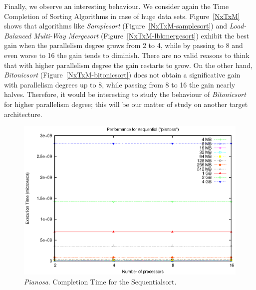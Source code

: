 Finally, we observe an interesting behaviour. We consider again the Time Completion of Sorting Algorithms in case of huge data sets. Figure~\ref{NxTxM} shows that algorithms like \textit{Samplesort} (Figure~\ref{NxTxM-samplesort}) and \textit{Load-Balanced Multi-Way Mergesort} (Figure~\ref{NxTxM-lbkmergesort}) exhibit the best gain when the parallelism degree grows from 2 to 4, while by passing to 8 and even worse to 16 the gain tends to diminish. There are no valid reasons to think that with higher parallelism degree the gain restarts to grow. On the other hand, \textit{Bitonicsort} (Figure~\ref{NxTxM-bitonicsort}) does not obtain a significative gain with parallelism degrees up to 8, while passing from 8 to 16 the gain nearly halves. Therefore, it would be interesting to study the behaviour of \textit{Bitonicsort} for higher parallelism degree; this will be our matter of study on another target architecture.

\begin{figure}[t]
	\begin{center}
		\includegraphics[scale=0.6]{plots/test_01_pianosa/NxTxM/sequential_pianosa_NxTxM}
	\end{center}
  	\caption{\textit{Pianosa}. Completion Time for the Sequentialsort.}
  	\label{sequential-pianosa}
\end{figure}

